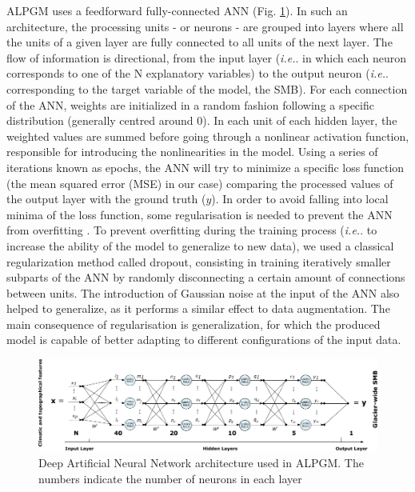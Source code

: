 ALPGM uses a feedforward fully-connected ANN (Fig. \ref{methods:fig3}). In such an architecture, the processing units - or neurons - are grouped into layers where all the units of a given layer are fully connected to all units of the next layer. The flow of information is directional, from the input layer (\textit{i.e.}. in which each neuron corresponds to one of the N explanatory variables) to the output neuron (\textit{i.e.}. corresponding to the target variable of the model, the SMB). For each connection of the ANN, weights are initialized in a random fashion following a specific distribution (generally centred around 0). In each unit of each hidden layer, the weighted values are summed before going through a nonlinear activation function, responsible for introducing the nonlinearities in the model. Using a series of iterations known as epochs, the ANN will try to minimize a specific loss function (the mean squared error (MSE) in our case) comparing the processed values of the output layer with the ground truth ($y$). In order to avoid falling into local minima of the loss function, some regularisation is needed to prevent the ANN from overfitting \citep{hastie_elements_2009}.  To prevent overfitting during the training process (\textit{i.e.}. to increase the ability of the model to generalize to new data), we used a classical regularization method called dropout, consisting in training iteratively smaller subparts of the ANN by randomly disconnecting a certain amount of connections between units. The introduction of Gaussian noise at the input of the ANN also helped to generalize, as it performs a similar effect to data augmentation. The main consequence of regularisation is generalization, for which the produced model is capable of better adapting to different configurations of the input data. 

\begin{figure}[t]
\includegraphics[width=15cm]{Figures/methods/Figure_3.pdf}
\caption{Deep Artificial Neural Network architecture used in ALPGM. The numbers indicate the number of neurons in each layer}
\label{methods:fig3}
\end{figure}

